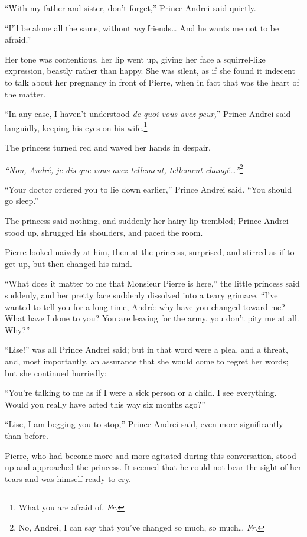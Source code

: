 ``With my father and sister, don't forget,'' Prince Andrei said quietly.

``I'll be alone all the same, without \emph{my} friends\ldots{} And he wants me not to be afraid.'' %

Her tone was contentious, her lip went up, giving her face a squirrel-like expression, beastly rather than happy. She was silent, as if she found it indecent to talk about her pregnancy in front of Pierre, when in fact that was the heart of the matter.

``In any case, I haven't understood \textit{de quoi vous avez peur,}'' Prince Andrei said languidly, keeping his eyes on his wife.\footnote{What you are afraid of. \textit{Fr.}} %

The princess turned red and waved her hands in despair.

\textit{``Non, Andr\'e, je dis que vous avez tellement, tellement chang\'e\ldots{}''}\footnote{No, Andrei, I can say that you've changed so much, so much\ldots{} \textit{Fr.}} %

``Your doctor ordered you to lie down earlier,'' Prince Andrei said. ``You should go sleep.'' %

The princess said nothing, and suddenly her hairy lip trembled; Prince Andrei stood up, shrugged his shoulders, and paced the room.

Pierre looked naively at him, then at the princess, surprised, and stirred as if to get up, but then changed his mind.

``What does it matter to me that Monsieur Pierre is here,'' the little princess said suddenly, and her pretty face suddenly dissolved into a teary grimace. ``I've wanted to tell you for a long time, Andr\'e: why have you changed toward me? What have I done to you? You are leaving for the army, you don't pity me at all. Why?'' %

``Lise!'' was all Prince Andrei said; but in that word were a plea, and a threat, and, most importantly, an assurance that she would come to regret her words; but she continued hurriedly: %

``You're talking to me as if I were a sick person or a child. I see everything. Would you really have acted this way six months ago?'' %

``Lise, I am begging you to stop,'' Prince Andrei said, even more significantly than before. %

Pierre, who had become more and more agitated during this conversation, stood up and approached the princess. It seemed that he could not bear the sight of her tears and was himself ready to cry.

